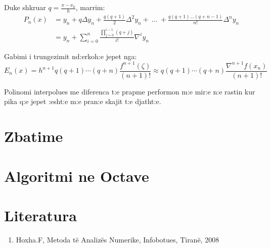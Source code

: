 \documentclass[12pt, margin=1in, a4paper]{article}
\begin{document}
  Duke shkruar \(q = \frac{x - x_0}{h}\), marrim:
  \begin{equation}
  \begin{aligned}
    P_n(x) &= y_n + q\Delta y_n + \frac{q(q + 1)}{2}\Delta^2y_n + \ \dots \ + \frac{q(q + 1)\dots(q + n - 1)}{n!}\Delta^n y_n \\
    &= y_n + \sum_{i = 0}^n{\frac{\prod_{j = 0}^{i - 1}{(q + j)}}{i!}\nabla^iy_n}
  \end{aligned}
  \end{equation}

  Gabimi i trungezimit nd:erkoh:e jepet nga:
  \begin{equation}
    E_n(x) = h^{n + 1}q(q + 1) \cdots (q + n)\frac{f^{n + 1}(\zeta)}{(n + 1)!} \approx q(q + 1) \cdots (q + n)\frac{\nabla^{n + 1}f(x_n)}{(n + 1)!}
  \end{equation}

  Polinomi interpolues me diferenca t:e prapme performon m:e mir:e n:e rastin
  kur pika q:e jepet :esht:e m:e pran:e skajit t:e djatht:e.


\section{Zbatime}

\section{Algoritmi ne Octave}

\section{Literatura}
\begin{enumerate}
  \item Hoxha.F, Metoda të Analizës Numerike, Infobotues, Tiranë, 2008
\end{enumerate}
\end{document}
